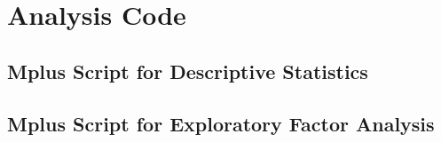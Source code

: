 \section{Analysis Code}\label{app:code}

\subsection{\textsf{Mplus} Script for Descriptive Statistics}

\begin{singlespacing}
    
\end{singlespacing}
\newpage

\subsection{\textsf{Mplus} Script for Exploratory Factor Analysis}

\begin{singlespacing}
    
\end{singlespacing}

\begin{singlespacing}
    
\end{singlespacing}

\newpage

\begin{singlespacing}
    
\end{singlespacing}

\newpage

\begin{singlespacing}
    
\end{singlespacing}

\newpage

\begin{singlespacing}
    
\end{singlespacing}

\newpage

\begin{singlespacing}
    
\end{singlespacing}


